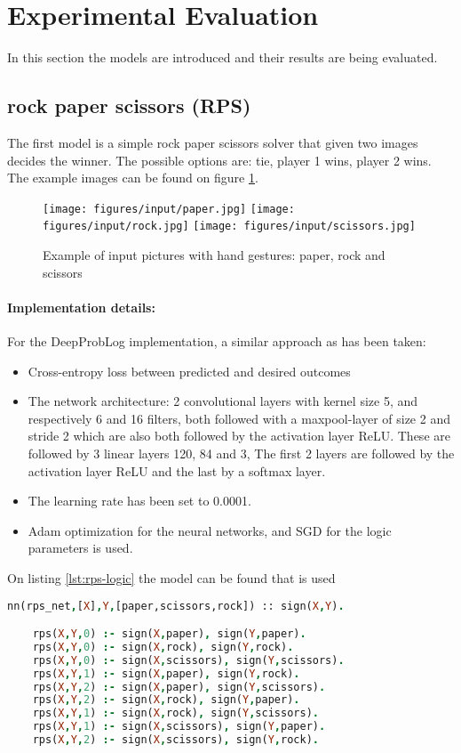 \section{Experimental Evaluation}
In this section the models are introduced and their results are being evaluated.
\subsection{rock paper scissors (RPS)}
The first model is a simple rock paper scissors solver that given two images decides the winner. The possible options are: tie, player 1 wins, player 2 wins. The example images can be found on figure \ref{fig:rps_input}.

\begin{figure}[htp]
    \centering
    \texttt{[image: figures/input/paper.jpg]}\hfill
    \texttt{[image: figures/input/rock.jpg]}\hfill
    \texttt{[image: figures/input/scissors.jpg]}
    \caption{Example of input pictures with hand gestures: paper, rock and scissors}
    \label{fig:rps_input}
\end{figure}

\paragraph{Implementation details:} For the DeepProbLog implementation, a similar approach as \cite{DBLP} has been taken:
\begin{itemize}
    \item Cross-entropy loss between predicted and desired outcomes
    \item The network architecture: 2 convolutional layers with kernel size 5, and respectively 6 and 16 filters, both followed with a maxpool-layer of size 2 and stride 2 which are also both followed by the activation layer ReLU. These are followed by 3 linear layers 120, 84 and 3, The first 2 layers are followed by the activation layer ReLU and the last by a softmax layer. \item The learning rate has been set to 0.0001. 
    \item Adam \cite{kingma2014adam} optimization for the neural networks, and SGD for the logic parameters is used.
  \end{itemize}
  On listing \ref{lst:rps-logic} the model can be found that is used

  \begin{lstlisting}[label={lst:rps-logic},language=Prolog,frame=single,caption={Rock paper scissors DeepProbLog model},captionpos=b]
    nn(rps_net,[X],Y,[paper,scissors,rock]) :: sign(X,Y).

    rps(X,Y,0) :- sign(X,paper), sign(Y,paper).
    rps(X,Y,0) :- sign(X,rock), sign(Y,rock).
    rps(X,Y,0) :- sign(X,scissors), sign(Y,scissors).
    rps(X,Y,1) :- sign(X,paper), sign(Y,rock).
    rps(X,Y,2) :- sign(X,paper), sign(Y,scissors).
    rps(X,Y,2) :- sign(X,rock), sign(Y,paper).
    rps(X,Y,1) :- sign(X,rock), sign(Y,scissors).
    rps(X,Y,1) :- sign(X,scissors), sign(Y,paper).
    rps(X,Y,2) :- sign(X,scissors), sign(Y,rock).
    \end{lstlisting}

